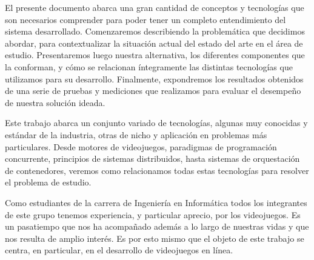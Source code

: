 \noindent El presente documento abarca una gran cantidad de conceptos y tecnologías que son necesarios comprender
para poder tener un completo entendimiento del sistema desarrollado. Comenzaremos describiendo la problemática que decidimos
abordar, para contextualizar la situación actual del estado del arte en el área de estudio. Presentaremos luego nuestra alternativa,
los diferentes componentes que la conforman, y cómo se relacionan íntegramente las distintas tecnologías que utilizamos para su desarrollo.
Finalmente, expondremos los resultados obtenidos de una serie de pruebas y mediciones que realizamos para evaluar el desempeño de nuestra solución ideada.

Este trabajo abarca un conjunto variado de tecnologías, algunas muy conocidas y estándar de la industria, otras de nicho y aplicación en problemas más particulares.
Desde motores de videojuegos, paradigmas de programación concurrente, principios de sistemas distribuidos, hasta sistemas de orquestación de contenedores, veremos como
relacionamos todas estas tecnologías para resolver el problema de estudio.

Como estudiantes de la carrera de Ingeniería en Informática todos los integrantes de este grupo tenemos experiencia, y particular aprecio, por los videojuegos.
Es un pasatiempo que nos ha acompañado además a lo largo de nuestras vidas y que nos resulta de amplio interés. Es por esto mismo que el objeto de este trabajo
se centra, en particular, en el desarrollo de videojuegos en línea. 
